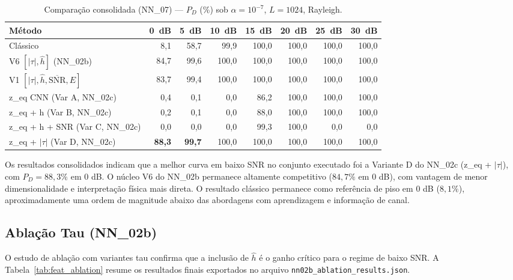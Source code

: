 \documentclass[12pt,a4paper]{article}
\begin{document}
\begin{table}[htb]
\caption{\label{tab:comparacao}Comparação consolidada (NN\_07) --- $P_D$ (\%) sob $\alpha = 10^{-7}$, $L=1024$, Rayleigh.}
\begin{center}
\begin{tabular}{lrrrrrrr}\toprule
Método & 0~dB & 5~dB & 10~dB & 15~dB & 20~dB & 25~dB & 30~dB \\\midrule
Clássico~\cite{ref_xie}                         &  8{,}1 & 58{,}7 & 99{,}9 & 100{,}0 & 100{,}0 & 100{,}0 & 100{,}0 \\
V6 $[|\tau|,\hat{h}]$ (NN\_02b)               & 84{,}7 & 99{,}6 & 100{,}0 & 100{,}0 & 100{,}0 & 100{,}0 & 100{,}0 \\
V1 $[|\tau|,\hat{h},\overline{\text{SNR}},E]$ & 83{,}7 & 99{,}4 & 100{,}0 & 100{,}0 & 100{,}0 & 100{,}0 & 100{,}0 \\
z\_eq CNN (Var A, NN\_02c)                     &  0{,}4 &  0{,}1 &  0{,}0 &  86{,}2 & 100{,}0 & 100{,}0 & 100{,}0 \\
z\_eq + h (Var B, NN\_02c)                     &  0{,}2 &  0{,}1 &  0{,}0 &  88{,}0 & 100{,}0 & 100{,}0 & 100{,}0 \\
z\_eq + h + SNR (Var C, NN\_02c)               &  0{,}0 &  0{,}0 &  0{,}0 &  99{,}3 & 100{,}0 &  0{,}0 &  0{,}0 \\
z\_eq + $|\tau|$ (Var D, NN\_02c)              & \textbf{88{,}3} & \textbf{99{,}7} & 100{,}0 & 100{,}0 & 100{,}0 & 100{,}0 & 100{,}0 \\\bottomrule
\end{tabular}
\end{center}
\end{table}

Os resultados consolidados indicam que a melhor curva em baixo SNR no conjunto executado foi a Variante D do NN\_02c (z\_eq + $|\tau|$), com $P_D=88{,}3\%$ em 0 dB. O núcleo V6 do NN\_02b permanece altamente competitivo ($84{,}7\%$ em 0 dB), com vantagem de menor dimensionalidade e interpretação física mais direta. O resultado clássico permanece como referência de piso em 0 dB ($8{,}1\%$), aproximadamente uma ordem de magnitude abaixo das abordagens com aprendizagem e informação de canal.

\subsection{Ablação Tau (NN\_02b)}

O estudo de ablação com variantes tau confirma que a inclusão de $\hat{h}$ é o ganho crítico para o regime de baixo SNR. A Tabela~\ref{tab:feat_ablation} resume os resultados finais exportados no arquivo \texttt{nn02b\_ablation\_results.json}.
\end{document}
